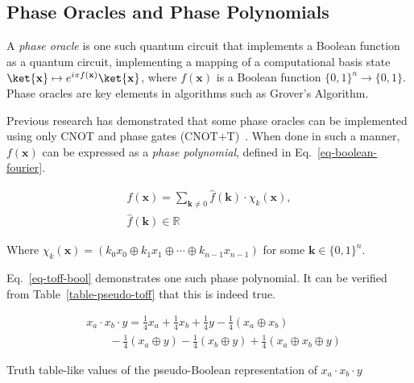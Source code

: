 \subsection{Phase Oracles and Phase Polynomials}
\label{Pre:oracle}
A {\it phase oracle} is one such quantum circuit that implements a Boolean function as a
quantum circuit, implementing a mapping of a computational basis state
$\ket{\mathbf{x}} \mapsto e^{i \pi f(\mathbf{x})}\ket{\mathbf{x}}$, where $f(\mathbf{x})$
is a Boolean function $\{0,1\}^n \rightarrow \{0,1\}$. Phase oracles are key elements in
algorithms such as Grover's Algorithm.

Previous research has demonstrated that some phase oracles can be implemented using only
CNOT and phase gates
(CNOT+T)~\cite{bib-amy-cnot}. When done in such a manner, $f(\mathbf{x})$ can be expressed
as a {\it phase polynomial},
defined in Eq.~\ref{eq-boolean-fourier}.

\begin{equation}
  \begin{aligned}
    \label{eq-boolean-fourier}
    f(\mathbf{x}) = \sum_{\mathbf{k} \neq 0} \hat{f}(\mathbf{k}) \cdot \chi_k(\mathbf{x}), \\\nonumber
    \hat{f}(\mathbf{k}) \in \mathbb{R}
  \end{aligned}
\end{equation}

Where $\chi_k(\mathbf{x}) = ( k_0 x_0 \oplus k_1 x_1 \oplus \cdots \oplus k_{n-1} x_{n-1})$
for some $\mathbf{k} \in \{0,1\}^{n}$.

Eq.~\ref{eq-toff-bool} demonstrates one such phase polynomial. It can be verified from
Table~\ref{table-pseudo-toff} that this is indeed true.

\begin{equation}
  \label{eq-toff-bool}
  \begin{aligned}
    &x_a \cdot x_b \cdot y = \frac{1}{4}x_a + \frac{1}{4}x_b + \frac{1}{4}y - \frac{1}{4}(x_a \oplus x_b) \\
    &\qquad -\frac{1}{4}(x_a \oplus y) - \frac{1}{4}(x_b \oplus y) + \frac{1}{4}(x_a \oplus x_b \oplus y)
  \end{aligned}
\end{equation}

\def\arraystretch{1.3}
\begin{table*}[h]
  \begin{minipage}{\textwidth}
    \begin{center}
      \scalebox{1.0} {
        
      }
      \caption{Truth table-like values of the pseudo-Boolean representation of $x_a \cdot x_b \cdot y$}
      \label{table-pseudo-toff}
    \end{center}
  \end{minipage}
\end{table*}
\def\arraystretch{1.1}

